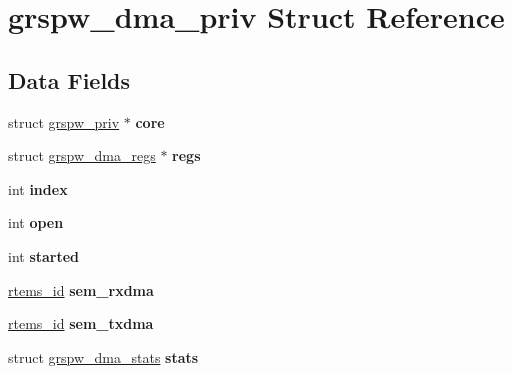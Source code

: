 \hypertarget{structgrspw__dma__priv}{}\section{grspw\+\_\+dma\+\_\+priv Struct Reference}
\label{structgrspw__dma__priv}
\subsection*{Data Fields}
\begin{DoxyCompactItemize}
\item 
\mbox{\label{structgrspw__dma__priv_a93ebf54d60eb71bd44176979adca425b}} 
struct \mbox{\hyperlink{structgrspw__priv}{grspw\+\_\+priv}} $\ast$ {\bfseries core}
\item 
\mbox{\label{structgrspw__dma__priv_ac86335b03abb841fa6ad8626008ce63e}} 
struct \mbox{\hyperlink{structgrspw__dma__regs}{grspw\+\_\+dma\+\_\+regs}} $\ast$ {\bfseries regs}
\item 
\mbox{\label{structgrspw__dma__priv_a291e36c63c8865b3ba6efc95e3fb1ec1}} 
int {\bfseries index}
\item 
\mbox{\label{structgrspw__dma__priv_abcfd557c805dc3389b6476391cee1dfb}} 
int {\bfseries open}
\item 
\mbox{\label{structgrspw__dma__priv_a2346b3537e53d6e7cca01b991bfb99c5}} 
int {\bfseries started}
\item 
\mbox{\label{structgrspw__dma__priv_a9fa6ed2725533c6538df93bc6e7bb2e4}} 
\mbox{\hyperlink{group__ClassicTasks_gab20892b814dced7dd4e5b9bf42becd57}{rtems\+\_\+id}} {\bfseries sem\+\_\+rxdma}
\item 
\mbox{\label{structgrspw__dma__priv_a069ef8fb9744cb3404ae23969b19efb3}} 
\mbox{\hyperlink{group__ClassicTasks_gab20892b814dced7dd4e5b9bf42becd57}{rtems\+\_\+id}} {\bfseries sem\+\_\+txdma}
\item 
\mbox{\label{structgrspw__dma__priv_a15b1d4cf2785f36a3b1395238e06a6a1}} 
struct \mbox{\hyperlink{structgrspw__dma__stats}{grspw\+\_\+dma\+\_\+stats}} {\bfseries stats}

\end{DoxyCompactItemize}
